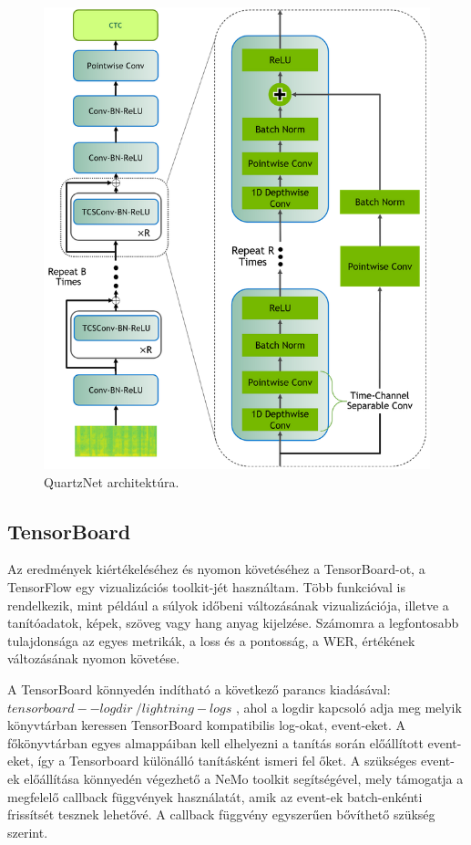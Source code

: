 \begin{figure}[!ht]
\centering
\includegraphics[width=150mm, keepaspectratio]{figures/QuartzNet-architecture.png}
\caption{QuartzNet architektúra. \cite{nemo}}
\end{figure}

\subsection{TensorBoard}

Az eredmények kiértékeléséhez és nyomon követéséhez a TensorBoard-ot, a TensorFlow egy vizualizációs toolkit-jét használtam. Több funkcióval is rendelkezik, mint például a súlyok időbeni változásának vizualizációja, illetve a tanítóadatok, képek, szöveg vagy hang anyag kijelzése. Számomra a legfontosabb tulajdonsága az egyes metrikák, a loss és a pontosság, a WER, értékének változásának nyomon követése.

A TensorBoard könnyedén indítható a következő parancs kiadásával: $tensorboard --logdir ~/lightning-logs$ , ahol a logdir kapcsoló adja meg melyik könyvtárban keressen TensorBoard kompatibilis log-okat, event-eket. A főkönyvtárban egyes almappáiban kell elhelyezni a tanítás során előállított event-eket, így a Tensorboard különálló tanításként ismeri fel őket. A szükséges event-ek előállítása könnyedén végezhető a NeMo toolkit segítségével, mely támogatja a megfelelő callback függvények használatát, amik az event-ek batch-enkénti frissítsét tesznek lehetővé. A callback függvény egyszerűen bővíthető szükség szerint.

